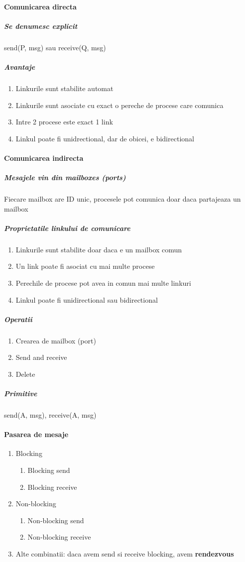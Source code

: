 \documentclass{article}
\begin{document}
\paragraph*{Comunicarea directa}
\subparagraph*{Se denumesc explicit} send(P, msg) sau receive(Q, msg)
\subparagraph*{Avantaje}
\begin{enumerate}
    \item Linkurile sunt stabilite automat
    \item Linkurile sunt asociate cu exact o pereche de procese care comunica
    \item Intre 2 procese este exact 1 link
    \item Linkul poate fi unidrectional, dar de obicei, e bidirectional
\end{enumerate}

\paragraph*{Comunicarea indirecta}
\subparagraph*{Mesajele vin din mailboxes (ports)} Fiecare mailbox are ID unic, procesele pot comunica doar daca partajeaza un mailbox
\subparagraph*{Proprietatile linkului de comunicare}
\begin{enumerate}
    \item Linkurile sunt stabilite doar daca e un mailbox comun
    \item Un link poate fi asociat cu mai multe procese
    \item Perechile de procese pot avea in comun mai multe linkuri
    \item Linkul poate fi unidirectional sau bidirectional
\end{enumerate}
\subparagraph*{Operatii}
\begin{enumerate}
    \item Crearea de mailbox (port)
    \item Send and receive
    \item Delete
\end{enumerate}
\subparagraph*{Primitive} send(A, msg), receive(A, msg)

\paragraph*{Pasarea de mesaje}
\begin{enumerate}
    \item Blocking
          \begin{enumerate}
              \item Blocking send
              \item Blocking receive
          \end{enumerate}
    \item Non-blocking
          \begin{enumerate}
              \item Non-blocking send
              \item Non-blocking receive
          \end{enumerate}
    \item Alte combinatii: daca avem send si receive blocking, avem \textbf{rendezvous}
\end{enumerate}
\end{document}
